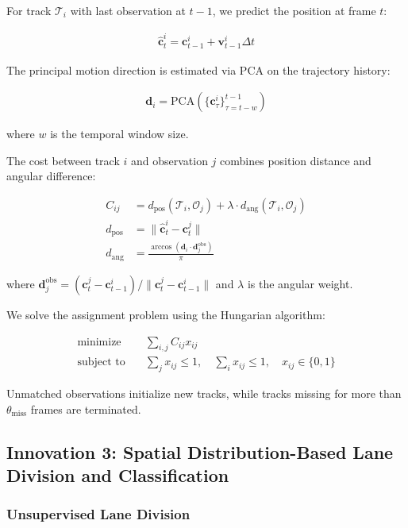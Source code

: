 \documentclass[numbered]{trbunofficial}
\begin{document}
For track $\mathcal{T}_i$ with last observation at $t-1$, we predict the position at frame $t$:

\begin{align}
  \hat{\mathbf{c}}_t^i = \mathbf{c}_{t-1}^i + \mathbf{v}_{t-1}^i \Delta t
\end{align}

The principal motion direction is estimated via PCA on the trajectory history:

\begin{align}
  \mathbf{d}_i = \text{PCA}(\{\mathbf{c}_{\tau}^i\}_{\tau=t-w}^{t-1})
\end{align}

where $w$ is the temporal window size.

The cost between track $i$ and observation $j$ combines position distance and angular difference:

\begin{align}
  C_{ij} &= d_{\text{pos}}(\mathcal{T}_i, \mathcal{O}_j) + \lambda \cdot d_{\text{ang}}(\mathcal{T}_i, \mathcal{O}_j) \\
  d_{\text{pos}} &= \|\hat{\mathbf{c}}_t^i - \mathbf{c}_t^j\| \\
  d_{\text{ang}} &= \frac{\arccos(\mathbf{d}_i \cdot \mathbf{d}_j^{\text{obs}})}{\pi}
\end{align}

where $\mathbf{d}_j^{\text{obs}} = (\mathbf{c}_t^j - \mathbf{c}_{t-1}^i) / \|\mathbf{c}_t^j - \mathbf{c}_{t-1}^i\|$ and $\lambda$ is the angular weight.

We solve the assignment problem using the Hungarian algorithm:

\begin{align}
  \text{minimize} \quad & \sum_{i,j} C_{ij} x_{ij} \\
  \text{subject to} \quad & \sum_j x_{ij} \leq 1, \quad \sum_i x_{ij} \leq 1, \quad x_{ij} \in \{0,1\}
\end{align}

Unmatched observations initialize new tracks, while tracks missing for more than $\theta_{\text{miss}}$ frames are terminated.


\subsection{Innovation 3: Spatial Distribution-Based Lane Division and Classification}

\subsubsection{Unsupervised Lane Division}
\end{document}
